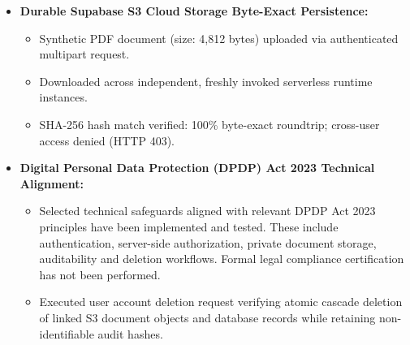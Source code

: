 \begin{itemize}
    \item \textbf{Durable Supabase S3 Cloud Storage Byte-Exact Persistence:}
    \begin{itemize}
        \item Synthetic PDF document (size: 4,812 bytes) uploaded via authenticated multipart request.
        \item Downloaded across independent, freshly invoked serverless runtime instances.
        \item SHA-256 hash match verified: 100\% byte-exact roundtrip; cross-user access denied (HTTP 403).
    \end{itemize}

    \item \textbf{Digital Personal Data Protection (DPDP) Act 2023 Technical Alignment:}
    \begin{itemize}
        \item Selected technical safeguards aligned with relevant DPDP Act 2023 principles have been implemented and tested. These include authentication, server-side authorization, private document storage, auditability and deletion workflows. Formal legal compliance certification has not been performed.
        \item Executed user account deletion request verifying atomic cascade deletion of linked S3 document objects and database records while retaining non-identifiable audit hashes.
    \end{itemize}
\end{itemize}
